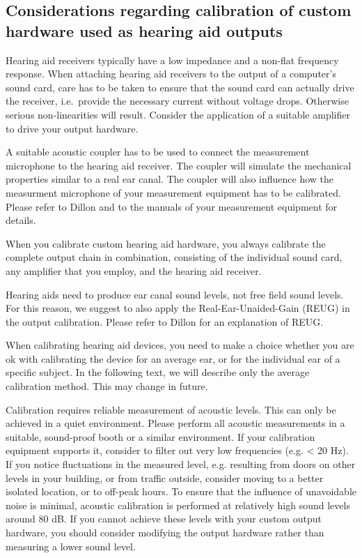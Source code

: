 \documentclass[11pt,a4paper,twoside]{article}
\newcommand{\+}{\discretionary{\mbox{\scriptsize$\hookleftarrow$}}{}{}}
\begin{document}
%

\subsection{Considerations regarding calibration of custom hardware used as hearing aid outputs}

Hearing aid receivers typically have a low impedance and a non-flat frequency response.
%
When attaching hearing aid receivers to the output of a computer's
sound card, care has to be taken to ensure that the sound card can
actually drive the receiver, i.e.\ provide the necessary current
without voltage drops.
%
Otherwise serious non-linearities will result.
%
Consider the application of a suitable amplifier to drive your output hardware.

A suitable acoustic coupler has to be used to connect the measurement
microphone to the hearing aid receiver.
%
The coupler will simulate the mechanical properties similar to
a real ear canal.
%
The coupler will also influence how the measurment microphone of your
measurement equipment has to be calibrated.
%
Please refer to Dillon and to the manuals of your measurement
equipment for details.

When you calibrate custom hearing aid hardware, you always calibrate
the complete output chain in combination, consisting of
%
the individual sound card, any amplifier that you employ, and the
hearing aid receiver.

Hearing aids need to produce ear canal sound levels, not free field
sound levels.
%
For this reason, we suggest to also apply the Real-Ear-Unaided-Gain
(REUG) in the \mha{} output calibration.
%
Please refer to Dillon for an explanation of REUG.

When calibrating hearing aid devices, you need to make a choice
whether you are ok with calibrating the device for an average ear, or
for the individual ear of a specific subject.
%
In the following text, we will describe only the average calibration
method. This may change in future.

Calibration requires reliable measurement of acoustic levels.
%
This can only be achieved in a quiet environment.
%
Please perform all acoustic measurements in a suitable, sound-proof
booth or a similar environment.
%
If your calibration equipment supports it, consider to filter out very
low frequencies (e.g. < 20 Hz).
%
If you notice fluctuations in the measured level, e.g. resulting from
doors on other levels in your building, or from traffic outside,
consider moving to a better isolated location, or to off-peak hours.
%
To ensure that the influence of unavoidable noise is minimal, acoustic
calibration is performed at relatively high sound levels around 80 dB.
%
If you cannot achieve these levels with your custom output hardware,
you should consider modifying the output hardware rather than
measuring a lower sound level.
\end{document}
